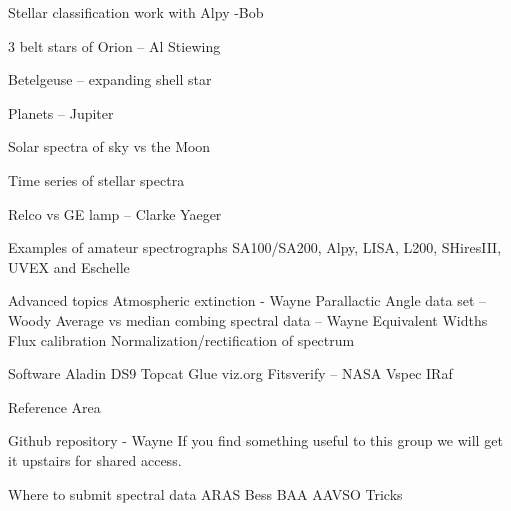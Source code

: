 Stellar classification work with Alpy -Bob

3 belt stars of Orion – Al Stiewing

Betelgeuse – expanding shell star



Planets – Jupiter

Solar spectra of sky vs the Moon

Time series of stellar spectra

Relco vs GE lamp – Clarke Yaeger


Examples of amateur spectrographs SA100/SA200, Alpy, 
    LISA, L200, SHiresIII, UVEX and Eschelle


Advanced topics
   Atmospheric extinction - Wayne
   Parallactic Angle data set – Woody
   Average vs median combing spectral data – Wayne
   Equivalent Widths
   Flux calibration
   Normalization/rectification of spectrum


Software
   Aladin
   DS9
   Topcat
   Glue viz.org
   Fitsverify – NASA
   Vspec
   IRaf

Reference Area

 Github repository - Wayne
    If you find something useful to this group we will get it 
    upstairs for shared access.

 Where to submit spectral data
   ARAS
   Bess
   BAA
   AAVSO
   Tricks

